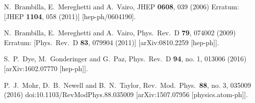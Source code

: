 \begin{thebibliography}{99}
  N.~Brambilla, E.~Mereghetti and A.~Vairo,
  JHEP {\bf 0608}, 039 (2006)
  Erratum: [JHEP {\bf 1104}, 058 (2011)]
  [hep-ph/0604190].
  
  N.~Brambilla, E.~Mereghetti and A.~Vairo,
  Phys.\ Rev.\ D {\bf 79}, 074002 (2009)
  Erratum: [Phys.\ Rev.\ D {\bf 83}, 079904 (2011)]
  [arXiv:0810.2259 [hep-ph]].
  
  S.~P.~Dye, M.~Gonderinger and G.~Paz,
  Phys.\ Rev.\ D {\bf 94}, no. 1, 013006 (2016)
  [arXiv:1602.07770 [hep-ph]].
  
  P.~J.~Mohr, D.~B.~Newell and B.~N.~Taylor,
  Rev.\ Mod.\ Phys.\  {\bf 88}, no. 3, 035009 (2016)
  doi:10.1103/RevModPhys.88.035009
  [arXiv:1507.07956 [physics.atom-ph]].

\end{thebibliography}
